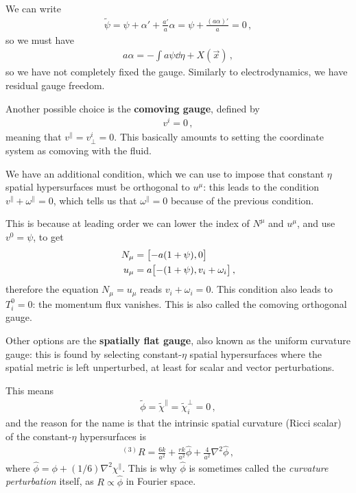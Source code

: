 \documentclass[main.tex]{subfiles}
\begin{document}
We can write 
%
\begin{align}
\widetilde{\psi} = \psi + \alpha ' + \frac{a'}{a} \alpha = \psi + \frac{(a \alpha )'}{a} = 0
\,,
\end{align}
%
so we must have 
%
\begin{align}
a \alpha = -\int a \psi \dd{\eta } + X(\vec{x})
\,,
\end{align}
%
so we have not completely fixed the gauge. 
Similarly to electrodynamics, we have residual gauge freedom. 

Another possible choice is the \textbf{comoving gauge}, 
defined by 
%
\begin{align}
v^{i} = 0
\,,
\end{align}
%
meaning that \(v^{\parallel} = v^{i}_\perp = 0\). This basically amounts to setting the coordinate system as comoving with the fluid.

We have an additional condition, which we can use to impose that constant \(\eta \) spatial hypersurfaces must be orthogonal to \(u^{\mu }\): this leads to the condition \(v^{\parallel} + \omega^{\parallel} = 0\), which tells us that \(\omega^{\parallel} = 0\) because of the previous condition. 

This is because at leading order we can lower the index of \(N^{\mu }\) and \(u^{\mu }\), and use \(v^{0}= \psi \), to get 
%
\begin{align}
N_{\mu } &= \qty[- a (1 + \psi ), 0]  \\
u_{\mu } &= a\qty[ - (1 + \psi ), v_i + \omega _i]
\,,
\end{align}
%
therefore the equation \(N_\mu = u_\mu \) reads \(v_i + \omega _i = 0\). 
This condition also leads to \(T^{0}_{i} = 0\): the momentum flux vanishes. 
This is also called the comoving orthogonal gauge. 


Other options are the \textbf{spatially flat gauge}, also known as the uniform curvature gauge: this is found by selecting constant-\(\eta \) spatial hypersurfaces where the spatial metric is left unperturbed, at least for scalar and vector perturbations. 

This means 
%
\begin{align}
\widetilde{\phi} = \widetilde{\chi}^{\parallel} = \widetilde{\chi}^{\perp}_i = 0
\,,
\end{align}
%
and the reason for the name is that the intrinsic spatial curvature (Ricci scalar) of the constant-\(\eta \) hypersurfaces is 
%
\begin{align}
^{(3)}R = \frac{6k}{a^2} + \frac{rk}{a^2} \hat{\phi} + \frac{4}{a^2} \nabla^2 \hat{\phi}
\,,
\end{align}
%
where \(\hat{\phi} = \phi + (1/6) \nabla^2 \chi^{\parallel}\). 
This is why \(\hat{\phi}\) is sometimes called the \emph{curvature perturbation} itself, as \(R \propto \hat{\phi}\) in Fourier space.
\end{document}

